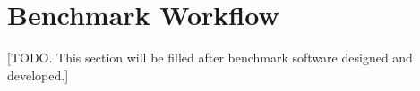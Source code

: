 
\section{Benchmark Workflow}
[TODO. This section will be filled after benchmark software designed and developed.]

